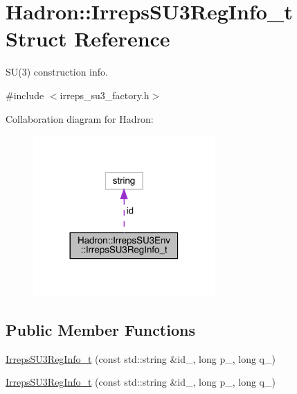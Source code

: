 \hypertarget{structHadron_1_1IrrepsSU3Env_1_1IrrepsSU3RegInfo__t}{}\section{Hadron\+:\+:Irreps\+S\+U3\+Reg\+Info\+\_\+t Struct Reference}
\label{structHadron_1_1IrrepsSU3Env_1_1IrrepsSU3RegInfo__t}


S\+U(3) construction info.  




{\ttfamily \#include $<$irreps\+\_\+su3\+\_\+factory.\+h$>$}



Collaboration diagram for Hadron\+:\nopagebreak
\begin{figure}[H]
\begin{center}
\leavevmode
\includegraphics[width=197pt]{df/d81/structHadron_1_1IrrepsSU3Env_1_1IrrepsSU3RegInfo__t__coll__graph}
\end{center}
\end{figure}
\subsection*{Public Member Functions}
\begin{DoxyCompactItemize}
\item 
\mbox{\hyperlink{structHadron_1_1IrrepsSU3Env_1_1IrrepsSU3RegInfo__t_ad3e33486ad0d29745aea8a67a190d58c}{Irreps\+S\+U3\+Reg\+Info\+\_\+t}} (const std\+::string \&id\+\_\+, long p\+\_\+, long q\+\_\+)
\item 
\mbox{\hyperlink{structHadron_1_1IrrepsSU3Env_1_1IrrepsSU3RegInfo__t_ad3e33486ad0d29745aea8a67a190d58c}{Irreps\+S\+U3\+Reg\+Info\+\_\+t}} (const std\+::string \&id\+\_\+, long p\+\_\+, long q\+\_\+)
\end{DoxyCompactItemize}
